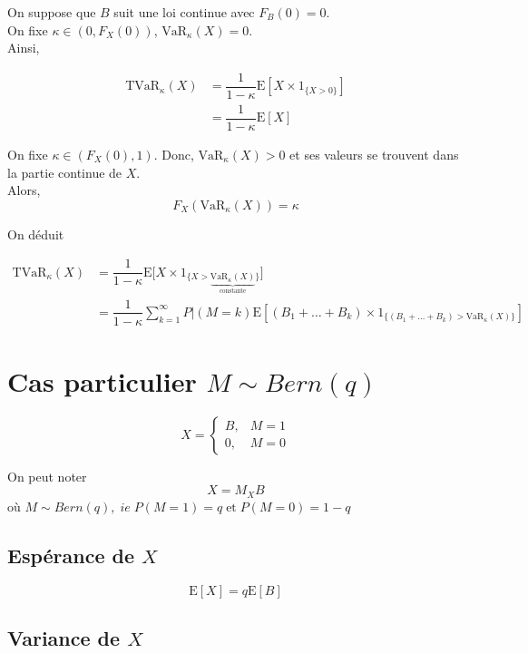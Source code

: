 \documentclass[]{book}
\theoremstyle{definition}
\theoremstyle{definition}
\theoremstyle{definition}
\theoremstyle{remark}
\begin{document}
On suppose que \(B\) suit une loi continue avec \(F_B(0)=0\).\\
On fixe \(\kappa \in (0,F_{X}(0))\), \(\text{VaR}_\kappa (X) =0\).\\
Ainsi,

\begin{align*}
\text{TVaR}_\kappa (X)& =\dfrac{1}{1-\kappa}\text{E}\left [X\times 1_{\{X>0\}}\right ]\\
& =\dfrac{1}{1-\kappa}\text{E}[X]
\end{align*}

On fixe \(\kappa \in (F_{X}(0),1)\). Donc, \(\text{VaR}_\kappa (X) >0\)
et ses valeurs se trouvent dans la partie continue de \(X\).\\
Alors, \[
F_X\left (\text{VaR}_\kappa (X) \right )=\kappa
\]

On déduit

\begin{align*}
\text{TVaR}_\kappa (X)&=\dfrac{1}{1-\kappa} \text{E}\big [X\times 1_{\{X>\underbrace{\text{VaR}_\kappa(X) }_{\text{constante}}\}}\big ]\\
& =\dfrac{1}{1-\kappa}\sum^\infty_{k=1} P|(M=k) \text{E}\left [(B_1+ \dots+ B_k)\times 1_{\{(B_1+ \dots+ B_k)> \text{VaR}_\kappa(X) \}}\right ]
\end{align*}

\section{\texorpdfstring{Cas particulier
\(M \sim Bern(q)\)}{Cas particulier M \textbackslash{}sim Bern(q)}}\label{cas-particulier-m-sim-bernq}

\[X=\begin{cases}
B,& M=1\\
0,& M=0
\end{cases}
\]

On peut noter \[
X =M_X B
\] où \(M \sim Bern(q), \; ie\; P(M=1)=q\; \text{et}\; P(M=0)=1-q\)

\subsection{\texorpdfstring{Espérance de
\(X\)}{Espérance de X}}\label{esperance-de-x-1}

\[
\text{E}[X]=q\text{E}[B]
\]

\subsection{\texorpdfstring{Variance de
\(X\)}{Variance de X}}\label{variance-de-x-1}
\end{document}

